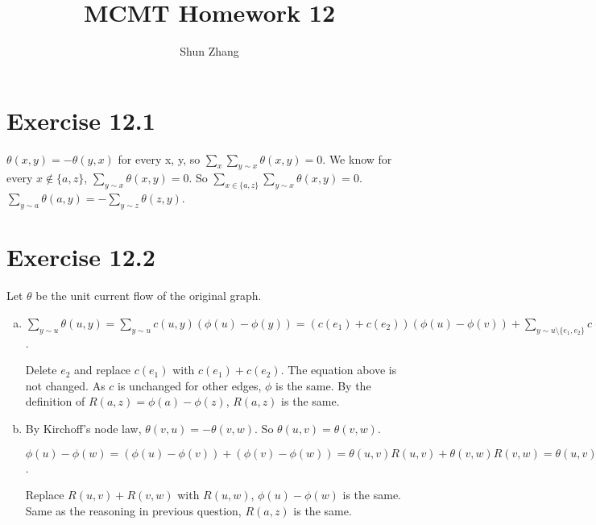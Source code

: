 \documentclass[10pt]{article}
\title{MCMT Homework 12}
\author{Shun Zhang}
\date{}
\begin{document}
\maketitle

\section*{Exercise 12.1}
$\theta(x, y) = -\theta(y, x)$ for every x, y, so $\sum_x \sum_{y \sim x}
\theta(x, y) = 0$. We know for every $x \not\in \{a,z\}$, $\sum_{y \sim x}
\theta(x,y)=0$. So $\sum_{x \in \{a, z\}} \sum_{y \sim x} \theta(x, y) = 0$. 
$\sum_{y \sim a} \theta(a,y)= -\sum_{y \sim z} \theta(z,y)$.

\section*{Exercise 12.2}
Let $\theta$ be the unit current flow of the original graph.

\begin{enumerate}[(a)]
\item
$\sum_{y \sim u} \theta(u, y) =
\sum_{y \sim u} c(u, y) (\phi(u) - \phi(y)) =
(c(e_1) + c(e_2)) (\phi(u) - \phi(v)) + \sum_{y \sim u \setminus \{e_1, e_2\}}
c(u, y) (\phi(u) - \phi(y)) = 0
$.

Delete $e_2$ and replace $c(e_1)$ with $c(e_1)+c(e_2)$. The equation above is
not changed. As $c$ is unchanged for other edges, $\phi$ is the same. By the
definition of $R(a, z) = \phi(a) - \phi(z)$, $R(a, z)$ is the same.

\item
By Kirchoff’s node law, $\theta(v, u) = - \theta(v, w)$. So $\theta(u, v) =
\theta(v, w)$.

$\phi(u) - \phi(w) = (\phi(u) - \phi(v)) + (\phi(v) - \phi(w)) = \theta(u, v)
R(u, v) + \theta(v, w) R(v, w) = \theta(u, v) (R(u, v) + R(v, w))$.

Replace $R(u, v) + R(v, w)$ with $R(u, w)$, $\phi(u) - \phi(w)$ is the same.
Same as the reasoning in previous question, $R(a, z)$ is the same.
\end{enumerate}
\end{document}
